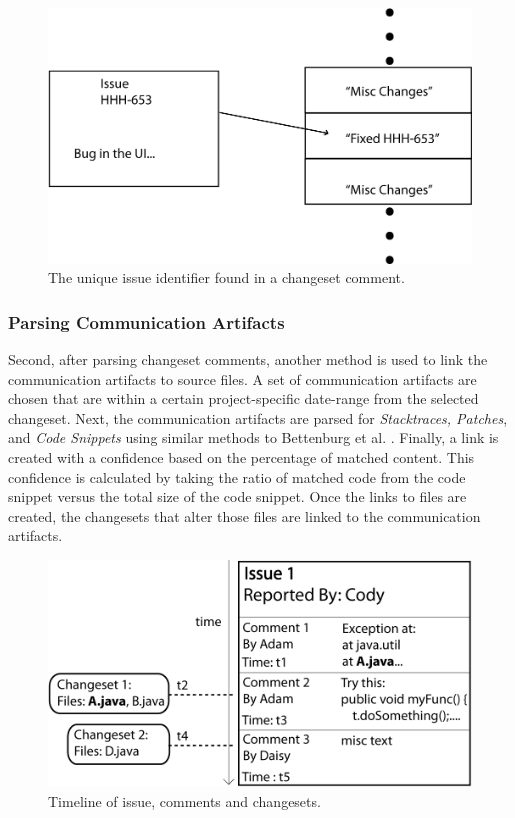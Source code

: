 \documentclass[conference]{IEEEtran}
\begin{document}
\begin{figure}[b!]
\centering
\includegraphics[width=1.0\columnwidth]{CommitsTochangesets1}
\caption{The unique issue identifier found in a changeset comment.\label{fig:identifier}}
\end{figure}

\subsubsection{Parsing Communication Artifacts}
\label{sec:parse}
Second, after parsing changeset comments, another method is used to link the communication artifacts to source files.  A set of communication artifacts are chosen that are within a certain project-specific date-range from the selected changeset.  Next, the communication artifacts are parsed for \textit{Stacktraces, Patches}, and \textit{Code Snippets} using similar methods to Bettenburg et al. \cite{Bettenburg:2008:ESI:1370750.1370757}.  Finally, a link is created with a confidence based on the percentage of matched content.  This confidence is calculated by taking the ratio of matched code from the code snippet versus the total size of the code snippet. Once the links to files are created, the changesets that alter those files are linked to the communication artifacts.

\begin{figure}[t!]
\centering
\includegraphics[width=1.0\columnwidth]{Items}
\caption{Timeline of issue, comments and changesets.\label{fig:items}}
\end{figure}
\end{document}
